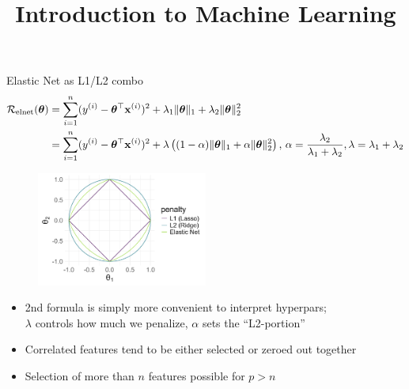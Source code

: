 \documentclass[11pt,compress,t,notes=noshow, xcolor=table]{beamer}
\title{Introduction to Machine Learning}
\begin{document}

\begin{vbframe}{Elastic Net as L1/L2 combo }
\vspace{-0.7cm}
\small{
\begin{align*}
\mathcal{R}_{\text{elnet}}(\bm{\theta}) &=  \sum\limits_{i=1}^n (y^{(i)} - \bm{\theta}^\top \mathbf{x}^{(i)})^2 + \lambda_1 \|\bm{\theta}\|_1 + \lambda_2 \|\bm{\theta}\|_2^2 \\
&= \sum\limits_{i=1}^n (y^{(i)} - \bm{\theta}^\top \mathbf{x}^{(i)})^2 + \lambda \left( (1-\alpha) \|\bm{\theta}\|_1 + \alpha \|\bm{\theta}\|_2^2\right),\, \alpha=\frac{\lambda_2}{\lambda_1+\lambda_2}, \lambda=\lambda_1+\lambda_2
\end{align*}}
\begin{figure}
\vspace{-0.3cm}
\includegraphics[width=0.5\textwidth]{figure/lasso_ridge_enet_2d.png}\\
\end{figure}
\vspace{-0.3cm}
\begin{itemize}
\item 2nd formula is simply more convenient to interpret hyperpars;\\
    $\lambda$ controls how much we penalize, $\alpha$ sets the ``L2-portion''
\item Correlated features tend to be either selected or zeroed out together
\item Selection of more than $n$ features possible for $p>n$
\end{itemize}
\end{vbframe}
\end{document}
